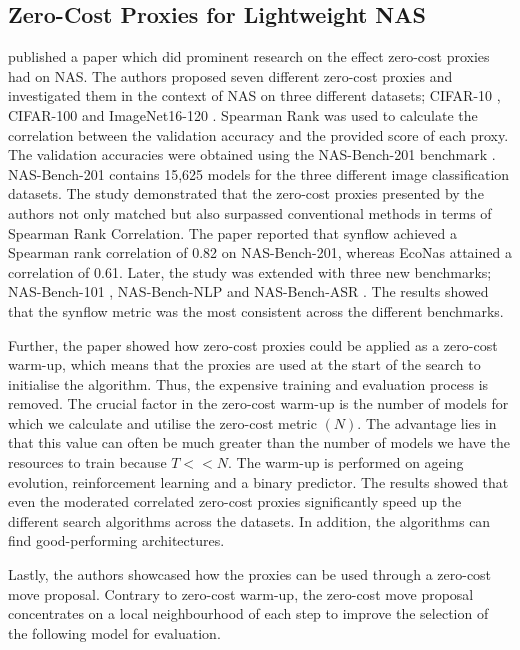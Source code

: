 \subsection{Zero-Cost Proxies for Lightweight NAS}\label{abdelfattah}
\cite{abdelfattah2021zero} published a paper which did prominent research on the effect zero-cost proxies had on NAS. The authors proposed seven different zero-cost proxies and investigated them in the context of NAS on three different datasets; CIFAR-10 \autocite{Krizhevsky2009LearningML}, CIFAR-100 \autocite{Krizhevsky2009LearningML} and ImageNet16-120 \autocite{deng2009imagenet}. Spearman Rank was used to calculate the correlation between the validation accuracy and the provided score of each proxy. The validation accuracies were obtained using the NAS-Bench-201 benchmark \autocite{dong2020bench}. NAS-Bench-201 contains 15,625 models for the three different image classification datasets. The study demonstrated that the zero-cost proxies presented by the authors not only matched but also surpassed conventional methods in terms of Spearman Rank Correlation. The paper reported that synflow achieved a Spearman rank correlation of 0.82 on NAS-Bench-201, whereas EcoNas attained a correlation of 0.61. Later, the study was extended with three new benchmarks; NAS-Bench-101 \autocite{ying2019bench}, NAS-Bench-NLP \autocite{https://doi.org/10.48550/arxiv.2006.07116} and NAS-Bench-ASR \autocite{mehrotra2021bench}. The results showed that the synflow metric was the most consistent across the different benchmarks. 

Further, the paper showed how zero-cost proxies could be applied as a zero-cost warm-up, which means that the proxies are used at the start of the search to initialise the algorithm. Thus, the expensive training and evaluation process is removed. The crucial factor in the zero-cost warm-up is the number of models for which we calculate and utilise the zero-cost metric $(N)$. The advantage lies in that this value can often be much greater than the number of models we have the resources to train because $T << N$. The warm-up is performed on ageing evolution, reinforcement learning and a binary predictor. The results showed that even the moderated correlated zero-cost proxies significantly speed up the different search algorithms across the datasets. In addition, the algorithms can find good-performing architectures. 

Lastly, the authors showcased how the proxies can be used through a zero-cost move proposal. Contrary to zero-cost warm-up, the zero-cost move proposal concentrates on a local neighbourhood of each step to improve the selection of the following model for evaluation. 